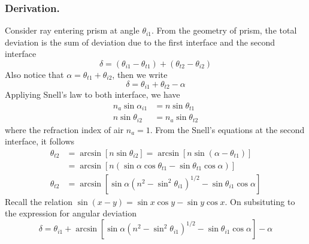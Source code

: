 \documentclass[../../../main.tex]{subfiles}
\begin{document}
\subsubsection{Derivation.} Consider ray entering prism at angle $\theta_{i1}$. From the geometry of prism, the total deviation is the sum of deviation due to the first interface and the second interface
\begin{equation*}
    \delta=(\theta_{i1}-\theta_{t1})+ (\theta_{t2}-\theta_{i2})
\end{equation*}
Also notice that $\alpha=\theta_{t1}+\theta_{i2}$, then we write
\begin{equation*}
    \delta=\theta_{i1}+\theta_{t2}-\alpha
\end{equation*}
Appliying Snell's law to both interface, we have 
\begin{align*}
    n_a\sin \alpha_{i1}&=n\sin \theta_{t1}\\
    n\sin\theta_{i2}&=n_a\sin \theta_{t2}
\end{align*}
where the refraction index of air $n_a=1$. From the Snell's equations at the second interface, it follows
\begin{align*}
    \theta_{t2}&=\arcsin\left[n\sin \theta_{i2}\right]=\arcsin\left[n\sin (\alpha-\theta_{t1})\right]\\
    &=\arcsin\left[n(\sin \alpha\cos\theta_{t1}-\sin\theta_{t1}\cos \alpha)\right]\\
    \theta_{t2}&=\arcsin\left[\sin \alpha(n^2-\sin^2\theta_{i1})^{1/2}-\sin\theta_{i1}\cos \alpha\right]
\end{align*}
Recall the relation $\sin (x-y)=\sin x\cos y-\sin y\cos x$. On subsituting to the expression for angular deviation
\begin{equation*}
    \delta=\theta_{i1}+\arcsin\left[\sin \alpha(n^2-\sin^2\theta_{i1})^{1/2}-\sin\theta_{i1}\cos \alpha\right]-\alpha
\end{equation*}
\end{document}
